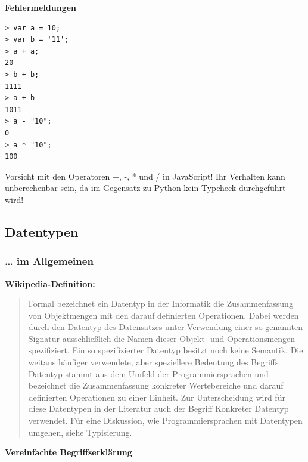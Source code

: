 \vspace{0.5cm}\par\noindent\textbf{Fehlermeldungen}\vspace{0.5cm}

\begin{verbatim}
> var a = 10;
> var b = '11';
> a + a;
20
> b + b;
1111
> a + b
1011
> a - "10";
0
> a * "10";
100
\end{verbatim}

{Vorsicht mit den Operatoren +, -, * und / in JavaScript! Ihr Verhalten
kann unberechenbar sein, da im Gegensatz zu Python kein Typcheck
durchgeführt wird!}

\subsection{\texorpdfstring{{Datentypen}}{Datentypen}}

\subsubsection{\texorpdfstring{{\ldots{} im
Allgemeinen}}{\ldots{} im Allgemeinen}}

\vspace{0.5cm}\par\noindent\textbf{\href{http://de.wikipedia.org/wiki/Datentyp}{Wikipedia-Definition:}}\vspace{0.5cm}

\begin{quote}
Formal bezeichnet ein Datentyp in der Informatik die Zusammenfassung von
Objektmengen mit den darauf definierten Operationen. Dabei werden durch
den Datentyp des Datensatzes unter Verwendung einer so genannten
Signatur ausschließlich die Namen dieser Objekt- und Operationsmengen
spezifiziert. Ein so spezifizierter Datentyp besitzt noch keine
Semantik. Die weitaus häufiger verwendete, aber speziellere Bedeutung
des Begriffs Datentyp stammt aus dem Umfeld der Programmiersprachen und
bezeichnet die Zusammenfassung konkreter Wertebereiche und darauf
definierten Operationen zu einer Einheit. Zur Unterscheidung wird für
diese Datentypen in der Literatur auch der Begriff Konkreter Datentyp
verwendet. Für eine Diskussion, wie Programmiersprachen mit Datentypen
umgehen, siehe Typisierung.
\end{quote}



\vspace{0.5cm}\par\noindent\textbf{Vereinfachte Begriffserklärung}\vspace{0.5cm}

